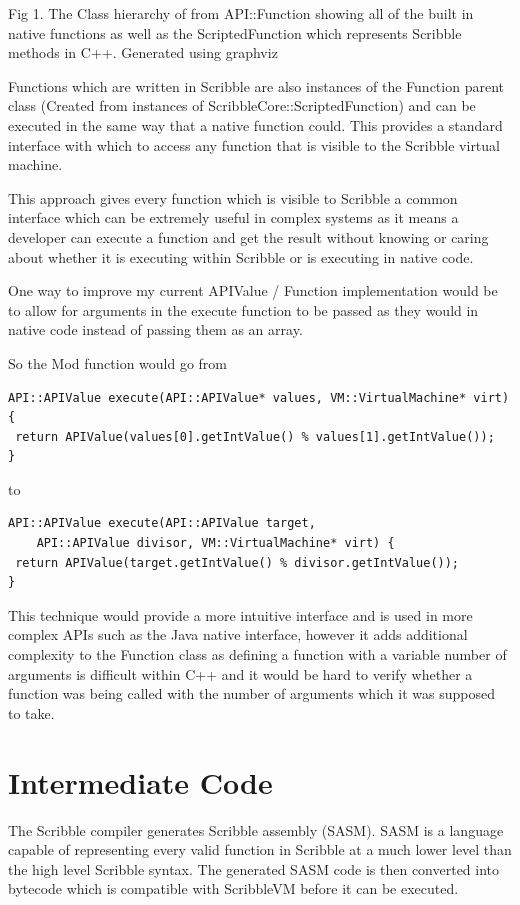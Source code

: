 \documentclass[]{final_report}
\begin{document}
Fig 1. The Class hierarchy of from API::Function showing all of the built in native functions as well as the ScriptedFunction which represents Scribble methods in C++. Generated using graphviz

Functions which are written in Scribble are also instances of the Function parent class (Created from instances of ScribbleCore::ScriptedFunction) and can be executed in the same way that a native function could. This provides a standard interface with which to access any function that is visible to the Scribble virtual machine.

This approach gives every function which is visible to Scribble a common interface which can be extremely useful in complex systems as it means a developer can execute a function and get the result without knowing or caring about whether it is executing within Scribble or is executing in native code.

One way to improve my current APIValue / Function implementation would be to allow for arguments in the execute function to be passed as they would in native code instead of passing them as an array.

So the Mod function would go from
\begin{verbatim}
API::APIValue execute(API::APIValue* values, VM::VirtualMachine* virt) {
 return APIValue(values[0].getIntValue() % values[1].getIntValue());
}
\end{verbatim}
to
\begin{verbatim}
API::APIValue execute(API::APIValue target, 
    API::APIValue divisor, VM::VirtualMachine* virt) {
 return APIValue(target.getIntValue() % divisor.getIntValue());
}
\end{verbatim}

This technique would provide a more intuitive interface and is used in more complex APIs such as the Java native interface, however it adds additional complexity to the Function class as defining a function with a variable number of arguments is difficult within C++ and it would be hard to verify whether a function was being called with the number of arguments which it was supposed to take.

\chapter{Intermediate Code}

The Scribble compiler generates Scribble assembly (SASM). SASM is a language capable of representing every valid function in Scribble at a much lower level than the high level Scribble syntax. The generated SASM code is then converted into bytecode which is compatible with ScribbleVM before it can be executed.
\end{document}
